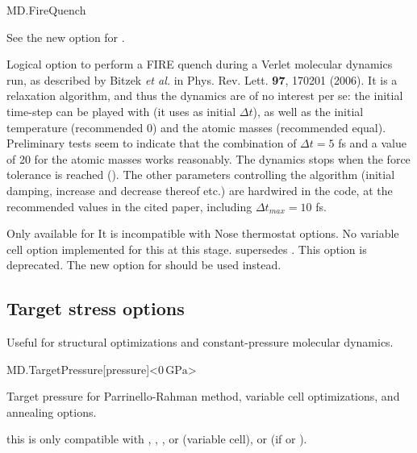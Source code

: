 \begin{fdflogicalF}{MD.FireQuench}
  
  See the new option  for .

  Logical option to perform a FIRE quench during a Verlet molecular
  dynamics run, as described by Bitzek \textit{et al.} in
  Phys. Rev. Lett. \textbf{97}, 170201 (2006). It is a relaxation
  algorithm, and thus the dynamics are of no interest per se: the
  initial time-step can be played with (it uses
   as initial $\Delta t$), as well as the
  initial temperature (recommended 0) and the atomic masses
  (recommended equal). Preliminary tests seem to indicate that the
  combination of $\Delta t = 5$ fs and a value of 20 for the atomic
  masses works reasonably. The dynamics stops when the force tolerance
  is reached (). The other parameters
  controlling the algorithm (initial damping, increase and decrease
  thereof etc.) are hardwired in the code, at the recommended values
  in the cited paper, including $\Delta t_{max} = 10$ fs.

  Only available for 
  It is incompatible with Nose thermostat options. No variable
  cell option implemented for this at this stage.
   supersedes . This option is
  deprecated. The new option  for  should be
  used instead.

\end{fdflogicalF}


\fi


\subsection{Target stress options}

Useful for structural optimizations and constant-pressure molecular
dynamics.

\begin{fdfentry}{MD.TargetPressure}[pressure]<$0\,\mathrm{GPa}$>
  
  Target pressure for Parrinello-Rahman method, variable cell
  optimizations, and annealing options.

  \note this is only compatible with 
   , ,
  ,  or  (variable cell), or 
  (if   or ).
  
\end{fdfentry}


